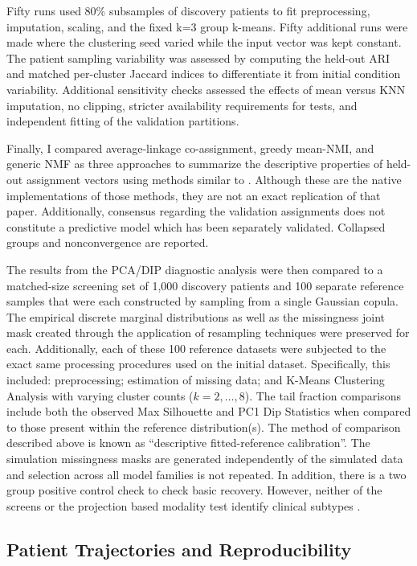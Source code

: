 Fifty runs used 80\% subsamples of discovery patients to fit preprocessing, imputation, scaling, and the fixed k=3 group k-means. Fifty additional runs were made where the clustering seed varied while the input vector was kept constant. The patient sampling variability was assessed by computing the held-out ARI and matched per-cluster Jaccard indices to differentiate it from initial condition variability. Additional sensitivity checks assessed the effects of mean versus KNN imputation, no clipping, stricter availability requirements for tests, and independent fitting of the validation partitions.

Finally, I compared average-linkage co-assignment, greedy mean-NMI, and generic NMF as three approaches to summarize the descriptive properties of held-out assignment vectors using methods similar to \textcite{tomo2026ensemble}. Although these are the native implementations of those methods, they are not an exact replication of that paper. Additionally, consensus regarding the validation assignments does not constitute a predictive model which has been separately validated. Collapsed groups and nonconvergence are reported.

The results from the PCA/DIP diagnostic analysis were then compared to a matched-size screening set of 1,000 discovery patients and 100 separate reference samples that were each constructed by sampling from a single Gaussian copula. The empirical discrete marginal distributions as well as the missingness joint mask created through the application of resampling techniques were preserved for each. Additionally, each of these 100 reference datasets were subjected to the exact same processing procedures used on the initial dataset. Specifically, this included: preprocessing; estimation of missing data; and K-Means Clustering Analysis with varying cluster counts ($k=2,\ldots,8$). The tail fraction comparisons include both the observed Max Silhouette and PC1 Dip Statistics when compared to those present within the reference distribution(s). The method of comparison described above is known as ``descriptive fitted-reference calibration''. The simulation missingness masks are generated independently of the simulated data and selection across all model families is not repeated. In addition, there is a two group positive control check to check basic recovery. However, neither of the screens or the projection based modality test identify clinical subtypes \parencite{neville2026clusterability}.

\subsection{Patient Trajectories and Reproducibility}

